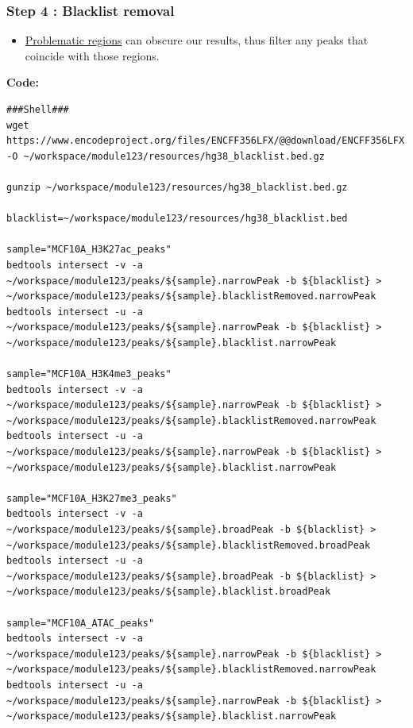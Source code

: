 \documentclass[
]{book}
\providecommand{\tightlist}{%
  \setlength{\itemsep}{0pt}\setlength{\parskip}{0pt}}
\begin{document}
\subsubsection{Step 4 : Blacklist removal}\label{step-4-blacklist-removal}

\begin{itemize}
\tightlist
\item
  \href{https://www.nature.com/articles/s41598-019-45839-z}{Problematic regions} can obscure our results, thus filter any peaks that coincide with those regions.
\end{itemize}

\textbf{Code:}

\begin{verbatim}
###Shell###
wget https://www.encodeproject.org/files/ENCFF356LFX/@@download/ENCFF356LFX.bed.gz -O ~/workspace/module123/resources/hg38_blacklist.bed.gz

gunzip ~/workspace/module123/resources/hg38_blacklist.bed.gz

blacklist=~/workspace/module123/resources/hg38_blacklist.bed

sample="MCF10A_H3K27ac_peaks"
bedtools intersect -v -a ~/workspace/module123/peaks/${sample}.narrowPeak -b ${blacklist} > ~/workspace/module123/peaks/${sample}.blacklistRemoved.narrowPeak
bedtools intersect -u -a ~/workspace/module123/peaks/${sample}.narrowPeak -b ${blacklist} > ~/workspace/module123/peaks/${sample}.blacklist.narrowPeak

sample="MCF10A_H3K4me3_peaks"
bedtools intersect -v -a ~/workspace/module123/peaks/${sample}.narrowPeak -b ${blacklist} > ~/workspace/module123/peaks/${sample}.blacklistRemoved.narrowPeak
bedtools intersect -u -a ~/workspace/module123/peaks/${sample}.narrowPeak -b ${blacklist} > ~/workspace/module123/peaks/${sample}.blacklist.narrowPeak

sample="MCF10A_H3K27me3_peaks"
bedtools intersect -v -a ~/workspace/module123/peaks/${sample}.broadPeak -b ${blacklist} > ~/workspace/module123/peaks/${sample}.blacklistRemoved.broadPeak
bedtools intersect -u -a ~/workspace/module123/peaks/${sample}.broadPeak -b ${blacklist} > ~/workspace/module123/peaks/${sample}.blacklist.broadPeak

sample="MCF10A_ATAC_peaks"
bedtools intersect -v -a ~/workspace/module123/peaks/${sample}.narrowPeak -b ${blacklist} > ~/workspace/module123/peaks/${sample}.blacklistRemoved.narrowPeak
bedtools intersect -u -a ~/workspace/module123/peaks/${sample}.narrowPeak -b ${blacklist} > ~/workspace/module123/peaks/${sample}.blacklist.narrowPeak
\end{verbatim}
\end{document}
